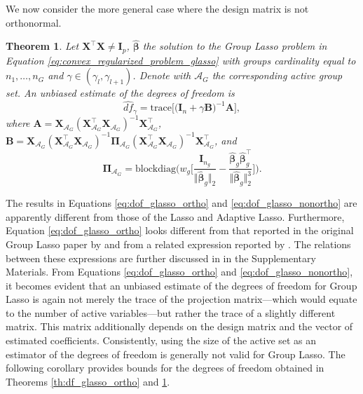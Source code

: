 \documentclass[a4paper, 12pt]{article}
\newcommand{\Aset}{\mathcal{A}}
\newcommand{\betahat}{\widehat{\boldsymbol\beta}}
\newcommand{\trace}{\mathrm{trace}}
\newcommand{\T}{\top}
\def\bPi{\boldsymbol{\Pi}}
\def\bA{\mathbf{A}}
\def\bB{\mathbf{B}}
\def\bI{\mathbf{I}}
\def\bX{\mathbf{X}}
\newtheorem{theorem}{Theorem}
\begin{document}
%
\noindent We now consider the more general case where the design matrix is not orthonormal.
\begin{theorem}
\label{th:df_glasso_nonortho} 
Let  $\bX^{\T}\bX \neq\bI_p$, $\betahat$ the solution to the Group Lasso problem in Equation \eqref{eq:convex_regularized_problem_glasso} with groups cardinality equal to $n_1, \ldots, n_G$ %
and $\gamma \in (\gamma_l, \gamma_{l+1})$. Denote with $\Aset_G$ the corresponding active group set. An unbiased estimate of the degrees of freedom is  
\begin{equation}
\label{eq:dof_glasso_nonortho}
\widehat{df}_\gamma = \trace \big[ \big(\bI_n+\gamma \bB\big)^{-1} \bA  \big],
\end{equation}
where $\bA = \bX_{\Aset_G}(\bX_{\Aset_G}^{\T}\bX_{\Aset_G})^{-1}\bX_{\Aset_G}^{\T}$,
$\bB = \bX_{\Aset_G}(\bX_{\Aset_G}^{\T}\bX_{\Aset_G})^{-1} \bPi_{\Aset_G} (\bX_{\Aset_G}^{\T}\bX_{\Aset_G})^{-1} \bX_{\Aset_G}^{\T}$,
and
\begin{equation*}
\bPi_{\Aset_G} = \mathrm{blockdiag}\bigg(w_g\bigg[\frac{\bI_{n_g}}{\Vert\betahat_g\Vert_2}-\frac{\betahat_g\betahat_g^{\T}}{\Vert\betahat_g\Vert_2^3}\bigg]\bigg).
\end{equation*}
\end{theorem}
%
\noindent The results in Equations \eqref{eq:dof_glasso_ortho} and \eqref{eq:dof_glasso_nonortho} are apparently different from those of the Lasso and Adaptive Lasso. %
Furthermore, Equation \eqref{eq:dof_glasso_ortho} looks different from that reported in the original Group Lasso paper by \cite{yuan:2006:glasso} and from a related expression reported by \cite{vaiter_etal.2017}. The relations between these expressions are further discussed in %
in the Supplementary Materials. 
%
From Equations \eqref{eq:dof_glasso_ortho} and \eqref{eq:dof_glasso_nonortho}, it becomes evident that an unbiased estimate of the degrees of freedom for Group Lasso is again not merely the trace of the projection matrix---which would equate to the number of active variables---but rather the trace of a slightly different matrix. This matrix additionally depends on the design matrix and the vector of estimated coefficients. Consistently, using the size of the active set as an estimator of the degrees of freedom is generally not valid for Group Lasso. The following corollary provides bounds for the degrees of freedom obtained in Theorems \ref{th:df_glasso_ortho} and \ref{th:df_glasso_nonortho}. 
\end{document}
